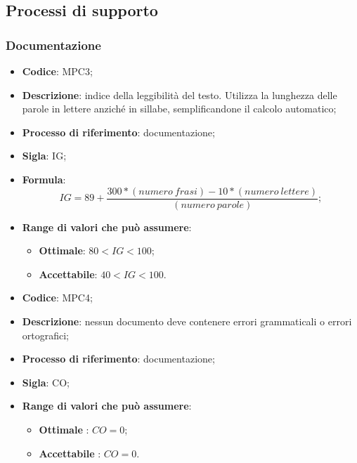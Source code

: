 \subsection{Processi di supporto}
\subsubsection{Documentazione}
\vspace{-1cm}
\begin{itemize}
	\item \textbf{Codice}: MPC3;
	\item \textbf{Descrizione}: indice della leggibilità del testo. Utilizza la lunghezza delle parole in lettere anziché in sillabe, semplificandone il calcolo automatico;
	\item \textbf{Processo di riferimento}: documentazione;
	\item \textbf{Sigla}: IG;
	\item \textbf{Formula}: \[ IG = 89 + \frac{300 \ast (numero \ frasi) - 10 \ast (numero \ lettere)}{(numero \ parole)}; \]
	\item \textbf{Range di valori che può assumere}:
		\begin{itemize}
			\item \textbf{Ottimale}: $80 < IG < 100$;
			\item \textbf{Accettabile}: $40 < IG < 100$.
		\end{itemize}
\end{itemize}
\vspace{-1cm}
\begin{itemize}
	\item \textbf{Codice}: MPC4;
	\item \textbf{Descrizione}: nessun documento deve contenere errori grammaticali o errori ortografici;
	\item \textbf{Processo di riferimento}: documentazione;
	\item \textbf{Sigla}: CO;
	\item \textbf{Range di valori che può assumere}:
		\begin{itemize}
			\item \textbf{Ottimale} : $CO = 0$;
			\item \textbf{Accettabile} : $CO = 0$.
		\end{itemize}
\end{itemize}

